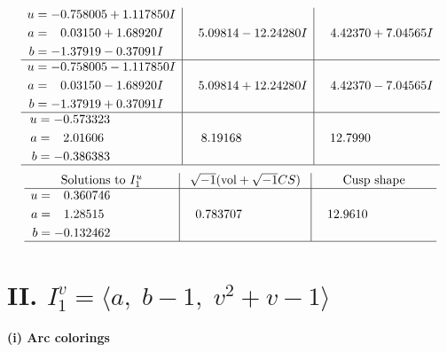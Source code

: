\documentclass[1p]{elsarticle_modified}
\theoremstyle{definition}
\newcommand{\I}{\sqrt{-1}}
\begin{document}
$$\begin{array}{c|c|c}
\begin{aligned}
u &= -0.758005 + 1.117850 I \\
a &= \phantom{-}0.03150 + 1.68920 I \\
b &= -1.37919 - 0.37091 I\end{aligned}
 & \phantom{-}5.09814 - 12.24280 I & \phantom{-}4.42370 + 7.04565 I \\ \hline\begin{aligned}
u &= -0.758005 - 1.117850 I \\
a &= \phantom{-}0.03150 - 1.68920 I \\
b &= -1.37919 + 0.37091 I\end{aligned}
 & \phantom{-}5.09814 + 12.24280 I & \phantom{-}4.42370 - 7.04565 I \\ \hline\begin{aligned}
u &= -0.573323\phantom{ +0.000000I} \\
a &= \phantom{-}2.01606\phantom{ +0.000000I} \\
b &= -0.386383\phantom{ +0.000000I}\end{aligned}
 & \phantom{-}8.19168\phantom{ +0.000000I} & \phantom{-}12.7990\phantom{ +0.000000I}\\
 \hline 
 \end{array}$$\newpage$$\begin{array}{c|c|c}  
\text{Solutions to }I^u_{1}& \I (\text{vol} + \sqrt{-1}CS) & \text{Cusp shape}\\
 \hline 
\begin{aligned}
u &= \phantom{-}0.360746\phantom{ +0.000000I} \\
a &= \phantom{-}1.28515\phantom{ +0.000000I} \\
b &= -0.132462\phantom{ +0.000000I}\end{aligned}
 & \phantom{-}0.783707\phantom{ +0.000000I} & \phantom{-}12.9610\phantom{ +0.000000I}\\
 \hline 
 \end{array}$$\newpage\newpage\renewcommand{\arraystretch}{1}
\centering \section*{II. $I^v_{1}= \langle a,\;b-1,\;v^2+v-1 \rangle$}
\flushleft \textbf{(i) Arc colorings}\\
\end{document}

